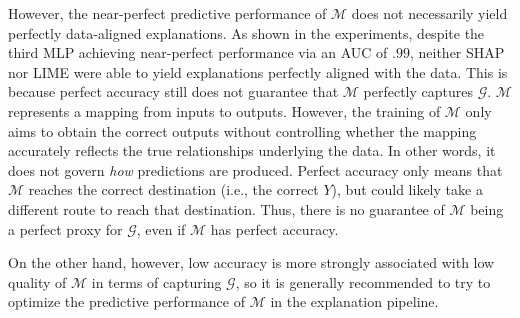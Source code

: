 \documentclass[12pt]{article}  %
\newcommand{\mG}{\mathcal{G}}
\newcommand{\mM}{\mathcal{M}}
\begin{document}
      However, the near-perfect predictive performance of $\mM$ does not necessarily yield perfectly data-aligned explanations. As shown in the experiments, despite the third MLP achieving near-perfect performance via an AUC of $.99$, neither SHAP nor LIME were able to yield explanations perfectly aligned with the data. This is because perfect accuracy still does not guarantee that $\mM$ perfectly captures $\mG$. $\mathcal{M}$ represents a mapping from inputs to outputs. However, the training of $\mM$ only aims to obtain the correct outputs without controlling whether the mapping accurately reflects the true relationships underlying the data. In other words, it does not govern \emph{how} predictions are produced. Perfect accuracy only means that $\mM$ reaches the correct destination (i.e., the correct $Y$), but could likely take a different route to reach that destination. Thus, there is no guarantee of $\mathcal{M}$ being a perfect proxy for $\mG$, even if $\mM$ has perfect accuracy. 
      
      On the other hand, however, low accuracy is more strongly associated with low quality of $\mM$ in terms of capturing $\mG$, so it is generally recommended to try to optimize the predictive performance of $\mM$ in the explanation pipeline.

   

  \vspace{-3mm} 
\end{document}
